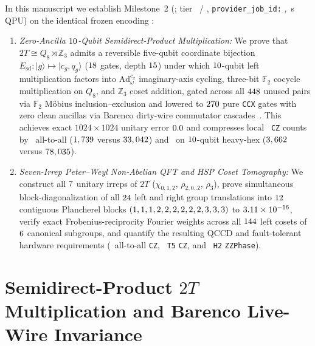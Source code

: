\documentclass[aps,prx,twocolumn,superscriptaddress,nofootinbib]{revtex4-2}
\begin{document}
In this manuscript we establish Milestone~2 (\btmExperimentId; tier \btmExecTier\ / \btmCompileTier, \texttt{provider\_job\_id:} \btmJobId, \btmQpuSec\,s QPU) on the identical frozen encoding \btmEncVer:
\begin{enumerate}
  \item \emph{Zero-Ancilla $10$-Qubit Semidirect-Product Multiplication:} We prove that $2T \cong Q_8 \rtimes \mathbb{Z}_3$ admits a reversible five-qubit coordinate bijection $E_{\mathrm{sd}}:|g\rangle \mapsto |c_g, q_g\rangle$ ($18$ gates, depth $15$) under which $10$-qubit left multiplication factors into $\mathrm{Ad}_\omega^{c_x}$ imaginary-axis cycling, three-bit $\mathbb{F}_2$ cocycle multiplication on $Q_8$, and $\mathbb{Z}_3$ coset addition, gated across all $448$ unused pairs via $\mathbb{F}_2$ M\"obius inclusion--exclusion and lowered to $270$ pure \texttt{CCX} gates with zero clean ancillas via Barenco dirty-wire commutator cascades~\cite{Barenco1995}. This achieves exact $1024\times 1024$ unitary error $0.0$ and compresses local \btmProxyTier\ \texttt{CZ} counts by \btmMulAtaCzRatio\ all-to-all ($1,739$ versus $33,042$) and \btmMulHhCzRatio\ on $10$-qubit heavy-hex ($3,662$ versus $78,035$).
  \item \emph{Seven-Irrep Peter--Weyl Non-Abelian QFT and HSP Coset Tomography:} We construct all $7$ unitary irreps of $2T$ ($\chi_{0,1,2}$, $\rho_{2,0..2}$, $\rho_3$), prove simultaneous block-diagonalization of all $24$ left and right group translations into $12$ contiguous Plancherel blocks $(1, 1, 1, 2, 2, 2, 2, 2, 2, 3, 3, 3)$ to $3.11 \times 10^{-16}$, verify exact Frobenius-reciprocity Fourier weights across all $144$ left cosets of $6$ canonical subgroups, and quantify the resulting QCCD and fault-tolerant hardware requirements (\btmQftAtaCz\ all-to-all \texttt{CZ}, \btmQftTfCz\ \texttt{T5} \texttt{CZ}, and \btmQftTkZz\ \texttt{H2} \texttt{ZZPhase}).
\end{enumerate}

\section{Semidirect-Product $2T$ Multiplication and Barenco Live-Wire Invariance}
\end{document}
